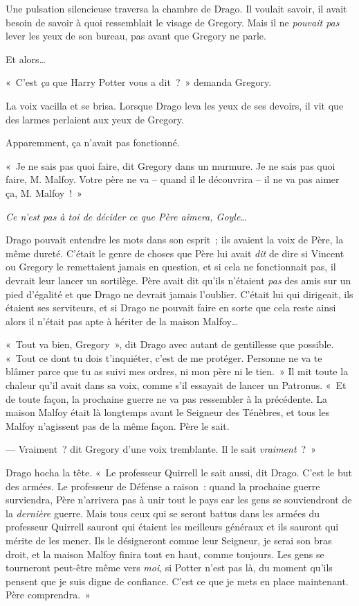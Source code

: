 Une pulsation silencieuse traversa la chambre de Drago.
Il voulait savoir, il avait besoin de savoir à quoi ressemblait le visage de Gregory.
Mais il ne \emph{pouvait pas} lever les yeux de son bureau, pas avant que Gregory ne parle.

Et alors…

«~C'est \emph{ça} que Harry Potter vous a dit~?~»
demanda Gregory.

La voix vacilla et se brisa.
Lorsque Drago leva les yeux de ses devoirs, il vit que des larmes perlaient aux yeux de Gregory.

Apparemment, ça n'avait pas fonctionné.

«~Je ne sais pas quoi faire, dit Gregory dans un murmure.
Je ne sais pas quoi faire, M. Malfoy.
Votre père ne va -- quand il le découvrira -- il ne va pas aimer ça, M. Malfoy~!~»

\emph{Ce n'est pas à toi de décider ce que Père aimera, Goyle…}

Drago pouvait entendre les mots dans son esprit~; ils avaient la voix de Père, la même dureté.
C'était le genre de choses que Père lui avait \emph{dit} de dire si Vincent ou Gregory le remettaient jamais en question, et si cela ne fonctionnait pas, il devrait leur lancer un sortilège.
Père avait dit qu'ils n'étaient \emph{pas} des amis sur un pied d'égalité et que Drago ne devrait jamais l'oublier.
C'était lui qui dirigeait, ils étaient ses serviteurs, et si Drago ne pouvait faire en sorte que cela reste ainsi alors il n'était pas apte à hériter de la maison Malfoy…

«~Tout va bien, Gregory~», dit Drago avec autant de gentillesse que possible.
«~Tout ce dont tu dois t'inquiéter, c'est de me protéger.
Personne ne va te blâmer parce que tu as suivi mes ordres, ni mon père ni le tien.~»
Il mit toute la chaleur qu'il avait dans sa voix, comme s'il essayait de lancer un Patronus.
«~Et de toute façon, la prochaine guerre ne va pas ressembler à la précédente.
La maison Malfoy était là longtemps avant le Seigneur des Ténèbres, et tous les Malfoy n'agissent pas de la même façon.
Père le sait.

--- Vraiment~? dit Gregory d'une voix tremblante.
Il le sait \emph{vraiment}~?~»

Drago hocha la tête.
«~Le professeur Quirrell le sait aussi, dit Drago.
C'est le but des armées.
Le professeur de Défense a raison~: quand la prochaine guerre surviendra, Père n'arrivera pas à unir tout le pays car les gens se souviendront de la \emph{dernière} guerre.
Mais tous ceux qui se seront battus dans les armées du professeur Quirrell sauront qui étaient les meilleurs généraux et ils sauront qui mérite de les mener.
Ils le désigneront comme leur Seigneur, je serai son bras droit, et la maison Malfoy finira tout en haut, comme toujours.
Les gens se tourneront peut-être même vers \emph{moi}, si Potter n'est pas là, du moment qu'ils pensent que je suis digne de confiance.
C'est ce que je mets en place maintenant.
Père comprendra.~»

